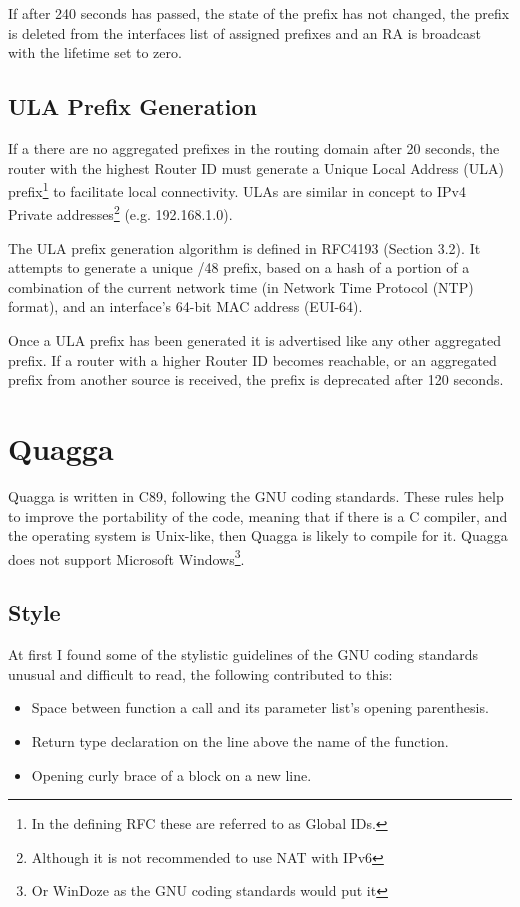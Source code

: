 \documentclass[12pt]{report}
\begin{document}
If after 240 seconds has passed, the state of the prefix has not changed, the
prefix is deleted from the interfaces list of assigned prefixes and an RA is
broadcast with the lifetime set to zero. 

\subsection{ULA Prefix Generation}
If a there are no aggregated prefixes in the routing domain after 20 seconds,
the router with the highest Router ID must generate a Unique Local Address
(ULA) prefix\footnote{In the defining
RFC these are referred to as Global IDs.} to facilitate local connectivity.
ULAs are similar in concept to IPv4 Private addresses\footnote{Although it is
not recommended to use NAT with IPv6} (e.g. 192.168.1.0). 

The ULA prefix generation algorithm is defined in RFC4193 (Section
3.2)\cite{rfc4193}. It attempts to generate a unique /48 prefix, based on a
hash of a portion of a combination of the current network time (in Network Time
Protocol (NTP)  format), and an
interface's 64-bit MAC address (EUI-64).

Once a ULA prefix has been generated it is advertised like any other aggregated
prefix. If a router with a higher Router ID becomes reachable, or an aggregated
prefix from another source is received, the prefix is deprecated after 120
seconds. 

\section{Quagga}
Quagga is written in C89, following the GNU coding
standards\cite{gnucodestandards}. These rules help to improve the portability
of the code, meaning that if there is a C compiler, and the operating system is
Unix-like, then Quagga is likely to compile for it.  Quagga does not
support Microsoft Windows\footnote{Or WinDoze as the GNU coding standards would
put it}.

\subsection{Style}
At first I found some of the stylistic guidelines of the GNU coding standards
unusual and difficult to read, the following contributed to this:
\begin{itemize} 
  \item Space between function a call and its parameter list's opening parenthesis.
  \item Return type declaration on the line above the name of the function.  
  \item Opening curly brace of a block on a new line.
\end{itemize}
\end{document}
